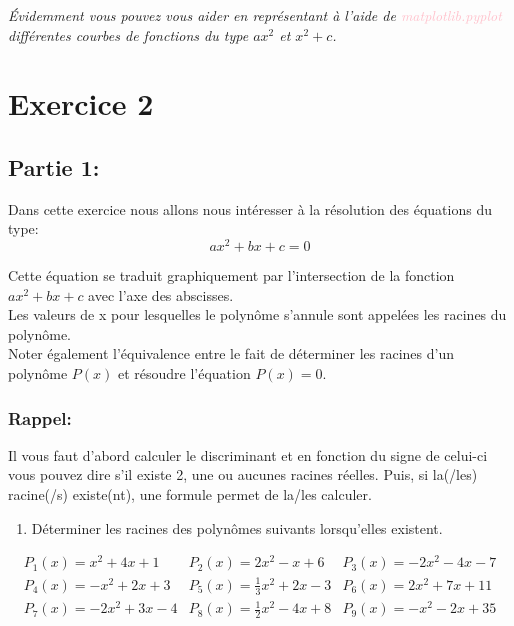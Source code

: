 \documentclass[11pt, french]{article}
\newcommand{\inlsnippet}[1]{\colorbox{gray!10}{\mbox{\textcolor{pink}{#1}}}}
\begin{document}
\textit{Évidemment vous pouvez vous aider en représentant à l'aide de \inlsnippet{matplotlib.pyplot}  différentes courbes de fonctions du type $ax^2$ et $x^2+c$.}


\section*{Exercice 2}

\subsection*{Partie 1:}
Dans cette exercice nous allons nous intéresser à la résolution des équations du type:
\begin{equation*}
    ax^2+bx+c = 0
\end{equation*}

Cette équation se traduit graphiquement par l'intersection de la fonction $ax^2+bx+c$ avec l'axe des abscisses.\\
Les valeurs de x pour lesquelles le polynôme s'annule sont appelées les racines du polynôme.\\
Noter également l'équivalence entre le fait de déterminer les racines d'un polynôme $P(x)$ et résoudre l'équation $P(x) = 0$.

\subsubsection*{Rappel:}
Il vous faut d'abord calculer le discriminant et en fonction du signe de celui-ci vous pouvez dire s'il existe 2, une ou aucunes racines réelles. Puis, si la(/les) racine(/s) existe(nt), une formule permet de la/les calculer.

\begin{enumerate}
    \item Déterminer les racines des polynômes suivants lorsqu'elles existent.
\end{enumerate}

\begin{equation*}
    \begin{matrix}
    P_1(x) = x^2 + 4x + 1 & P_2(x) = 2x^2 - x +6 & P_3(x) = -2x^2 - 4x - 7 \\
    P_4(x) = -x^2 + 2x + 3 & P_5(x) = \frac{1}{3}x^2 + 2x - 3 & P_6(x) = 2x^2 + 7x + 11 \\
    P_7(x) = -2x^2 + 3x - 4 & P_8(x) = \frac{1}{2}x^2 - 4x + 8 & P_9(x) = -x^2 - 2x +35
    \end{matrix}
\end{equation*}
\end{document}
